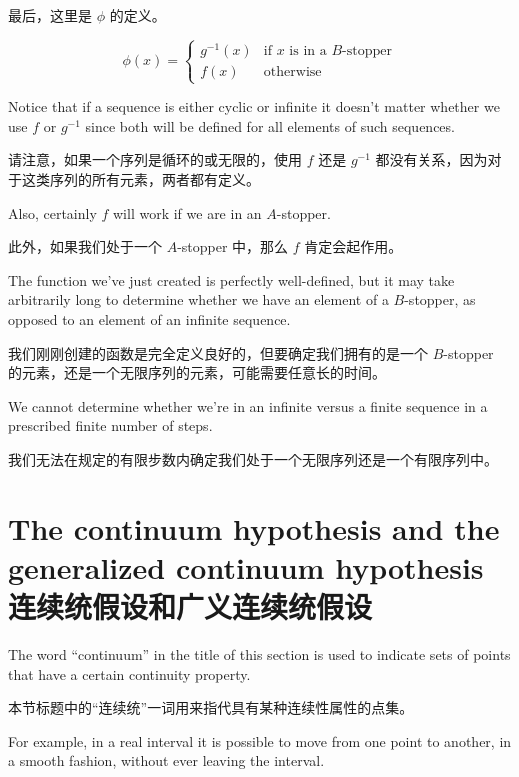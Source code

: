 最后，这里是 $\phi$ 的定义。

\[ \phi(x) =  \left\{ \begin{array}{cl} g^{-1}(x) & \mbox{if $x$ is in a $B$-stopper} \\ f(x) & \mbox{otherwise} \end{array} \right.
\]

Notice that if a sequence is either cyclic or infinite it doesn't matter
whether we use $f$ or $g^{-1}$ since both will be
defined for all elements of such
sequences.

请注意，如果一个序列是循环的或无限的，使用 $f$ 还是 $g^{-1}$ 都没有关系，因为对于这类序列的所有元素，两者都有定义。

Also, certainly $f$ will work if we are in an $A$-stopper.

此外，如果我们处于一个 $A$-stopper 中，那么 $f$ 肯定会起作用。

The function  we've just created is perfectly well-defined, but it may take
arbitrarily long to determine whether we have an element of a $B$-stopper, as
opposed to an element of an infinite sequence.

我们刚刚创建的函数是完全定义良好的，但要确定我们拥有的是一个 $B$-stopper 的元素，还是一个无限序列的元素，可能需要任意长的时间。

We cannot determine whether
we're in an infinite versus a finite sequence in a prescribed finite number of
steps.

我们无法在规定的有限步数内确定我们处于一个无限序列还是一个有限序列中。

\clearpage





\newpage

\section[CH and GCH]{The continuum hypothesis and the generalized continuum hypothesis 连续统假设和广义连续统假设}
\label{sec:ch_gch}

The word ``continuum'' in the title of this section is used to indicate sets of
points that have a certain continuity property.

本节标题中的“连续统”一词用来指代具有某种连续性属性的点集。

For example, in a real interval
it is possible to move from one point to another, in a smooth fashion, without
ever leaving the interval.

